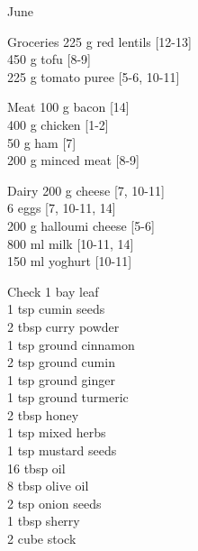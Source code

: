 \begin{menu}{June}
\begin{shoppinglist}{Groceries}
      225 g red lentils {\scriptsize[12-13]}\\
      450 g tofu {\scriptsize[8-9]}\\
      225 g tomato puree {\scriptsize[5-6, 10-11]}\\
      \end{shoppinglist}%
      \par\vfil %
      \begin{shoppinglist}{Meat}
      100 g bacon {\scriptsize[14]}\\
      400 g chicken {\scriptsize[1-2]}\\
      50 g ham {\scriptsize[7]}\\
      200 g minced meat {\scriptsize[8-9]}\\
      \end{shoppinglist}%
      \begin{shoppinglist}{Dairy}
      200 g cheese {\scriptsize[7, 10-11]}\\
      6  eggs {\scriptsize[7, 10-11, 14]}\\
      200 g halloumi cheese {\scriptsize[5-6]}\\
      800 ml milk {\scriptsize[10-11, 14]}\\
      150 ml yoghurt {\scriptsize[10-11]}\\
      \end{shoppinglist}%
      \par\vfil %
      \vfil\clearpage %
      \begin{shoppinglist}{Check}
      1  bay leaf \\
      1 tsp cumin seeds \\
      2 tbsp curry powder \\
      1 tsp ground cinnamon \\
      2 tsp ground cumin \\
      1 tsp ground ginger \\
      1 tsp ground turmeric \\
      2 tbsp honey \\
      1 tsp mixed herbs \\
      1 tsp mustard seeds \\
      16 tbsp oil \\
      8 tbsp olive oil \\
      2 tsp onion seeds \\
      1 tbsp sherry \\
      2 cube stock \\

\end{shoppinglist}
\end{menu}
